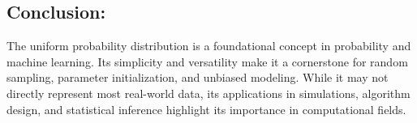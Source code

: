 \subsection*{Conclusion:}
The uniform probability distribution is a foundational concept in probability and machine learning. Its simplicity and versatility make it a cornerstone for random sampling, parameter initialization, and unbiased modeling. While it may not directly represent most real-world data, its applications in simulations, algorithm design, and statistical inference highlight its importance in computational fields.
